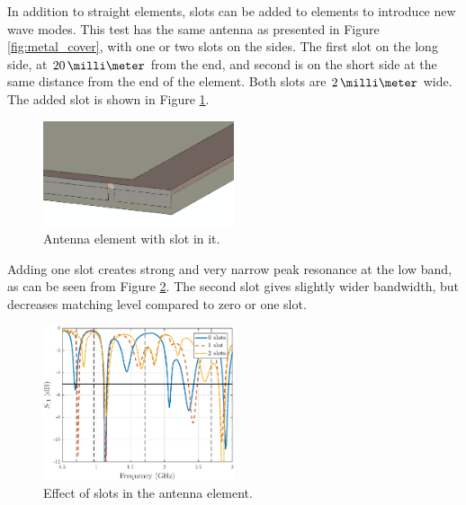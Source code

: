 In addition to straight elements, slots can be added to elements to introduce new wave modes. This test has the same antenna as presented in Figure \ref{fig:metal_cover}, with one or two slots on the sides. The first slot on the long side, at $20\,\milli\meter$ from the end, and second is on the short side at the same distance from the end of the element. Both slots are $2\,\milli\meter$ wide. The added slot is shown in Figure \ref{fig:slot}.
\begin{figure}[H]
    \centering
    \includegraphics[width=0.5\textwidth]{img/slot.eps}
    \caption{Antenna element with slot in it.}
    \label{fig:slot}
\end{figure}

Adding one slot creates strong and very narrow peak resonance at the low band, as can be seen from Figure \ref{fig:slot_res}. The second slot gives slightly wider bandwidth, but decreases matching level compared to zero or one slot.

\begin{figure}[H]
    \centering
    \includegraphics[width=0.5\textwidth]{img/slot_res.eps}
    \caption{Effect of slots in the antenna element.}
    \label{fig:slot_res}
\end{figure}

